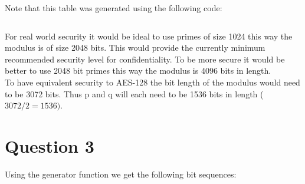 \documentclass[fleqn, 12pt]{article}
\newcommand{\codefile}{\inputminted}
\begin{document}
Note that this table was generated using the following code:

\codefile{Javascript}{q2/q2.js}

For real world security it would be ideal to use primes of size 1024 this way the modulus is of size 2048 bits. This would provide the currently minimum recommended security level for confidentiality. To be more secure it would be better to use 2048 bit primes this way the modulus is 4096 bits in length.\\

To have equivalent security to AES-128 the bit length of the modulus would need to be 3072 bits. Thus p and q will each need to be 1536 bits in length ($3072/2=1536)$.

\section*{Question 3}

Using the generator function we get the following bit sequences:\\
\end{document}
